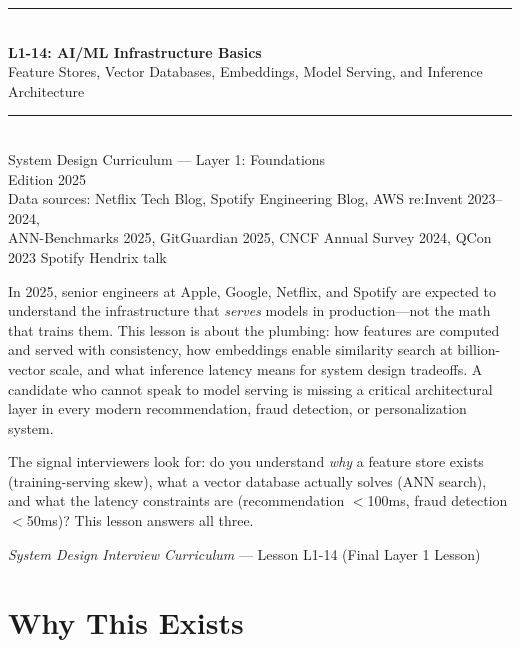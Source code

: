 \documentclass[11pt,a4paper]{article}
\begin{document}
\begin{titlepage}
\centering
\vspace*{2cm}
{\color{primary}\rule{\linewidth}{1.5pt}}\\[0.4cm]
{\huge\bfseries\color{primary} L1-14: AI/ML Infrastructure Basics}\\[0.3cm]
{\Large\color{highlight} Feature Stores, Vector Databases, Embeddings, Model Serving, and Inference Architecture}\\[0.2cm]
{\color{primary}\rule{\linewidth}{1.5pt}}\\[1cm]
{\large System Design Curriculum --- Layer 1: Foundations}\\[0.4cm]
{\normalsize Edition 2025}\\[0.3cm]
{\small Data sources: Netflix Tech Blog, Spotify Engineering Blog, AWS re:Invent 2023--2024,\\
ANN-Benchmarks 2025, GitGuardian 2025, CNCF Annual Survey 2024, QCon 2023 Spotify Hendrix talk}\\[2cm]

\begin{insightbox}
In 2025, senior engineers at Apple, Google, Netflix, and Spotify are expected to understand the infrastructure that \textit{serves} models in production---not the math that trains them. This lesson is about the plumbing: how features are computed and served with consistency, how embeddings enable similarity search at billion-vector scale, and what inference latency means for system design tradeoffs. A candidate who cannot speak to model serving is missing a critical architectural layer in every modern recommendation, fraud detection, or personalization system.

The signal interviewers look for: do you understand \textit{why} a feature store exists (training-serving skew), what a vector database actually solves (ANN search), and what the latency constraints are (recommendation $<$100ms, fraud detection $<$50ms)? This lesson answers all three.
\end{insightbox}

\vfill
{\small \textit{System Design Interview Curriculum} --- Lesson L1-14 (Final Layer 1 Lesson)}
\end{titlepage}

\tableofcontents
{}
\newpage

\section{Why This Exists}
\end{document}
